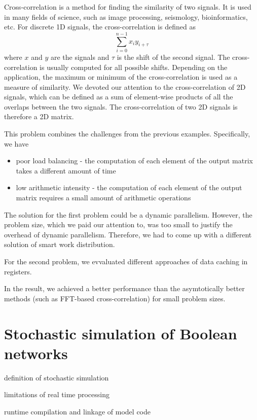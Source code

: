 Cross-correlation is a method for finding the similarity of two signals. It is used in many fields of science, such as image processing, seismology, bioinformatics, etc. For discrete 1D signals, the cross-correlation is defined as
$$ \sum_{i=0}^{n-1} x_i y_{i + \tau} $$
where $x$ and $y$ are the signals and $\tau$ is the shift of the second signal. The cross-correlation is usually computed for all possible shifts. Depending on the application, the maximum or minimum of the cross-correlation is used as a measure of similarity.
We devoted our attention to the cross-correlation of 2D signals, which can be defined as a sum of element-wise products of all the overlaps between the two signals. The cross-correlation of two 2D signals is therefore a 2D matrix.

This problem combines the challenges from the previous examples. Specifically, we have
\begin{itemize}
    \item poor load balancing - the computation of each element of the output matrix takes a different amount of time
    \item low arithmetic intensity - the computation of each element of the output matrix requires a small amount of arithmetic operations
\end{itemize}

The solution for the first problem could be a dynamic parallelism. However, the problem size, which we paid our attention to, was too small to justify the overhead of dynamic parallelism. Therefore, we had to come up with a different solution of smart work distribution.

For the second problem, we evvaluated different approaches of data caching in registers.

In the result, we achieved a better performance than the asymtotically better methods (such as FFT-based cross-correlation) for small problem sizes.

\section{Stochastic simulation of Boolean networks}

definition of stochastic simulation

limitations of real time processing

runtime compilation and linkage of model code